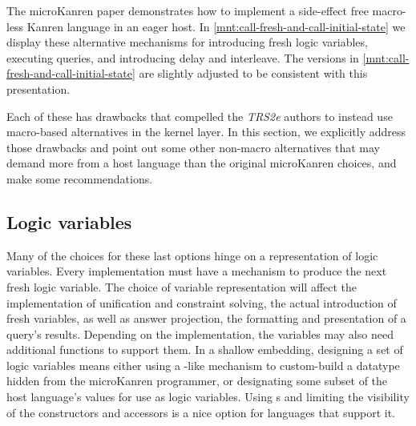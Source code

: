 \documentclass[runningheads,natbib=false]{llncs}
\begin{document}
The \citeyear{hemann2013muKanren} microKanren paper demonstrates how
to implement a side-effect free macro-less Kanren language in an eager
host. In \cref{mnt:call-fresh-and-call-initial-state} we display these
alternative mechanisms for introducing fresh logic variables,
executing queries, and introducing delay and interleave. The versions
in \cref{mnt:call-fresh-and-call-initial-state} are slightly adjusted
to be consistent with this presentation.





Each of these has drawbacks that compelled the \emph{TRS2e} authors to
instead use macro-based alternatives in the kernel layer. In this
section, we explicitly address those drawbacks and point out some
other non-macro alternatives that may demand more from a host language
than the original microKanren choices, and make some recommendations.

\subsection{Logic variables}

Many of the choices for these last options hinge on a representation
of logic variables. Every implementation must have a mechanism to
produce the next fresh logic variable. The choice of variable
representation will affect the implementation of unification and
constraint solving, the actual introduction of fresh variables, as
well as answer projection, the formatting and presentation of a
query's results. Depending on the implementation, the variables may
also need additional functions to support them. In a shallow
embedding, designing a set of logic variables means either using a
-like mechanism to custom-build a datatype hidden
from the microKanren programmer, or designating some subset of the
host language's values for use as logic variables. Using
s and limiting the visibility of the constructors
and accessors is a nice option for languages that support it.
\end{document}
